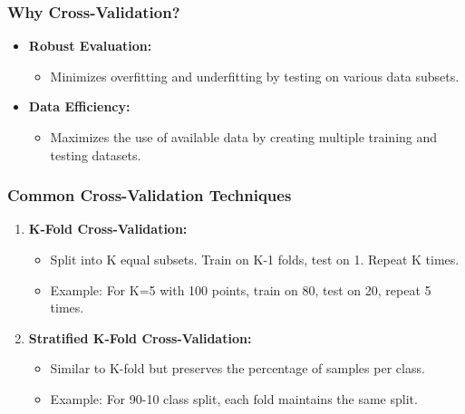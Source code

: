 \documentclass[aspectratio=169]{beamer}
\begin{document}
\begin{frame}[fragile]
    \frametitle{Why Cross-Validation?}
    \begin{itemize}
        \item \textbf{Robust Evaluation:} 
            \begin{itemize}
                \item Minimizes overfitting and underfitting by testing on various data subsets.
            \end{itemize}
        \item \textbf{Data Efficiency:} 
            \begin{itemize}
                \item Maximizes the use of available data by creating multiple training and testing datasets.
            \end{itemize}
    \end{itemize}
\end{frame}

\begin{frame}[fragile]
    \frametitle{Common Cross-Validation Techniques}
    \begin{enumerate}
        \item \textbf{K-Fold Cross-Validation:}
            \begin{itemize}
                \item Split into K equal subsets. Train on K-1 folds, test on 1. Repeat K times.
                \item Example: For K=5 with 100 points, train on 80, test on 20, repeat 5 times.
            \end{itemize}
        \item \textbf{Stratified K-Fold Cross-Validation:}
            \begin{itemize}
                \item Similar to K-fold but preserves the percentage of samples per class.
                \item Example: For 90-10 class split, each fold maintains the same split.
            \end{itemize}
    \end{enumerate}
\end{frame}
\end{document}
